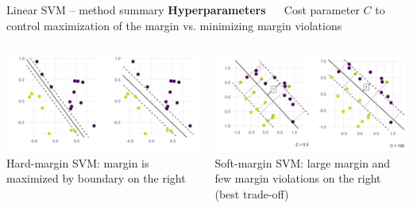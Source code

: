 \documentclass[11pt,compress,t,notes=noshow, xcolor=table]{beamer}
\newcommand{\highlight}[1]{\textcolor{hlcol}{\textbf{#1}}}
\begin{document}
\begin{vbframe}{Linear SVM -- method summary}
\highlight{Hyperparameters} ~~ Cost parameter \textbf{$C$} to control maximization of the margin vs. minimizing margin violations

\hfill
\begin{columns}
  \begin{column}{0.5\textwidth}
  \centering
      \includegraphics[width=\textwidth]{
figure/linear_classif_2.png}  \\
\tiny{Hard-margin SVM: margin is maximized by boundary on the right}
  \end{column}
  \begin{column}{0.5\textwidth}
  \centering
\includegraphics[width=\textwidth]{
figure/margin_violations.png}  \\
\tiny{Soft-margin SVM: large margin and few margin violations on the right (best trade-off)}
  \end{column}
\end{columns}

\normalsize

\end{vbframe}
\end{document}

